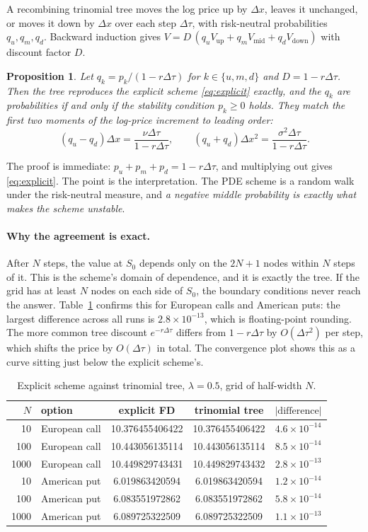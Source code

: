 \documentclass[11pt,a4paper]{article}
\newtheorem{proposition}{Proposition}
\newcommand{\Dt}{\Delta\tau}
\newcommand{\Dx}{\Delta x}
\begin{document}
A recombining trinomial tree moves the log price up by $\Dx$, leaves it unchanged, or moves it
down by $\Dx$ over each step $\Dt$, with risk-neutral probabilities $q_u,q_m,q_d$. Backward
induction gives $V=D\,(q_uV_{\text{up}}+q_mV_{\text{mid}}+q_dV_{\text{down}})$ with discount
factor $D$.

\begin{proposition}
Let $q_k=p_k/(1-r\Dt)$ for $k\in\{u,m,d\}$ and $D=1-r\Dt$. Then the tree reproduces the explicit
scheme \eqref{eq:explicit} exactly, and the $q_k$ are probabilities if and only if the
stability condition $p_k\ge0$ holds. They match the first two moments of the log-price
increment to leading order:
\[
(q_u-q_d)\Dx=\frac{\nu\Dt}{1-r\Dt},\qquad (q_u+q_d)\Dx^2=\frac{\sigma^2\Dt}{1-r\Dt}.
\]
\end{proposition}

\noindent The proof is immediate: $p_u+p_m+p_d=1-r\Dt$, and multiplying out gives
\eqref{eq:explicit}. The point is the interpretation. The PDE scheme is a random walk under the
risk-neutral measure, and \emph{a negative middle probability is exactly what makes the scheme
unstable}.

\paragraph{Why the agreement is exact.} After $N$ steps, the value at $S_0$ depends only on the
$2N+1$ nodes within $N$ steps of it. This is the scheme's domain of dependence, and it is
exactly the tree. If the grid has at least $N$ nodes on each side of $S_0$, the boundary
conditions never reach the answer. Table~\ref{tab:tree} confirms this for European calls and
American puts: the largest difference across all runs is $2.8\times10^{-13}$, which is
floating-point rounding. The more common tree discount $e^{-r\Dt}$ differs from $1-r\Dt$ by
$O(\Dt^2)$ per step, which shifts the price by $O(\Dt)$ in total. The convergence plot shows
this as a curve sitting just below the explicit scheme's.

\begin{table}[h]\centering\small
\begin{tabular}{rlccc}
\toprule
$N$ & option & explicit FD & trinomial tree & $|\text{difference}|$\\
\midrule
10   & European call & 10.376455406422 & 10.376455406422 & $4.6\times10^{-14}$\\
100  & European call & 10.443056135114 & 10.443056135114 & $8.5\times10^{-14}$\\
1000 & European call & 10.449829743431 & 10.449829743432 & $2.8\times10^{-13}$\\
10   & American put  & 6.019863420594  & 6.019863420594  & $1.2\times10^{-14}$\\
100  & American put  & 6.083551972862  & 6.083551972862  & $5.8\times10^{-14}$\\
1000 & American put  & 6.089725322509  & 6.089725322509  & $1.1\times10^{-13}$\\
\bottomrule
\end{tabular}
\caption{Explicit scheme against trinomial tree, $\lambda=0.5$, grid of half-width $N$.}
\label{tab:tree}
\end{table}
\end{document}
